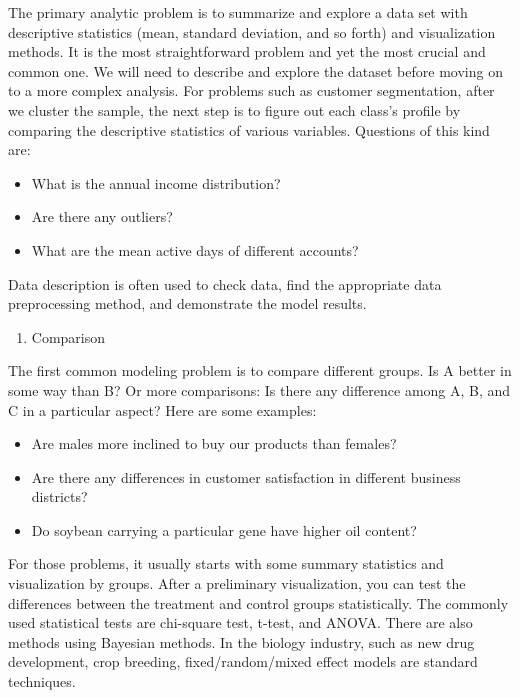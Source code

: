 \documentclass[
  12pt,
]{krantz}
\providecommand{\tightlist}{%
  \setlength{\itemsep}{0pt}\setlength{\parskip}{0pt}}
\begin{document}
The primary analytic problem is to summarize and explore a data set with descriptive statistics (mean, standard deviation, and so forth) and visualization methods. It is the most straightforward problem and yet the most crucial and common one. We will need to describe and explore the dataset before moving on to a more complex analysis. For problems such as customer segmentation, after we cluster the sample, the next step is to figure out each class's profile by comparing the descriptive statistics of various variables. Questions of this kind are:

\begin{itemize}
\tightlist
\item
  What is the annual income distribution?
\item
  Are there any outliers?
\item
  What are the mean active days of different accounts?
\end{itemize}

Data description is often used to check data, find the appropriate data preprocessing method, and demonstrate the model results.

\begin{enumerate}
\def\labelenumi{\arabic{enumi}.}
\setcounter{enumi}{1}
\tightlist
\item
  Comparison
\end{enumerate}

The first common modeling problem is to compare different groups. Is A better in some way than B? Or more comparisons: Is there any difference among A, B, and C in a particular aspect? Here are some examples:

\begin{itemize}
\tightlist
\item
  Are males more inclined to buy our products than females?
\item
  Are there any differences in customer satisfaction in different business districts?
\item
  Do soybean carrying a particular gene have higher oil content?
\end{itemize}

For those problems, it usually starts with some summary statistics and visualization by groups. After a preliminary visualization, you can test the differences between the treatment and control groups statistically. The commonly used statistical tests are chi-square test, t-test, and ANOVA. There are also methods using Bayesian methods. In the biology industry, such as new drug development, crop breeding, fixed/random/mixed effect models are standard techniques.
\end{document}
